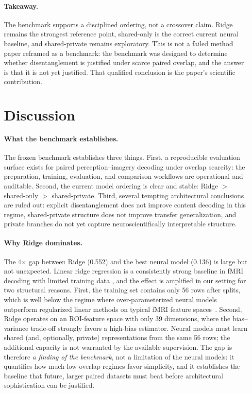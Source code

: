 \documentclass{article}
\begin{document}
\paragraph{Takeaway.}
The benchmark supports a disciplined ordering, not a crossover claim.  Ridge
remains the strongest reference point, shared-only is the correct current
neural baseline, and shared-private remains exploratory.  This is not a failed
method paper reframed as a benchmark: the benchmark was designed to determine
whether disentanglement is justified under scarce paired overlap, and the answer
is that it is not yet justified.  That qualified conclusion is the paper's
scientific contribution.

\section{Discussion}

\paragraph{What the benchmark establishes.}
The frozen benchmark establishes three things.  First, a reproducible evaluation
surface exists for paired perception--imagery decoding under overlap scarcity:
the preparation, training, evaluation, and comparison workflows are operational
and auditable.  Second, the current model ordering is clear and stable:
Ridge $>$ shared-only $>$ shared-private.  Third, several tempting architectural
conclusions are ruled out: explicit disentanglement does not improve content
decoding in this regime, shared-private structure does not improve transfer
generalization, and private branches do not yet capture neuroscientifically
interpretable structure.

\paragraph{Why Ridge dominates.}
The 4$\times$ gap between Ridge (0.552) and the best neural model (0.136) is
large but not unexpected.  Linear ridge regression is a consistently strong
baseline in fMRI decoding with limited training data
\citep{naselaris2011encoding}, and the effect is amplified in our setting for
two structural reasons.  First, the training set contains only 56 rows after
splits, which is well below the regime where over-parameterized neural models
outperform regularized linear methods on typical fMRI feature
spaces~\citep{horikawa2017generic}.  Second, Ridge operates on an ROI-feature
space with only 39 dimensions, where the bias--variance trade-off strongly
favors a high-bias estimator.  Neural models must learn shared (and,
optionally, private) representations from the same 56 rows; the additional
capacity is not warranted by the available supervision.  The gap is therefore
\emph{a finding of the benchmark}, not a limitation of the neural models: it
quantifies how much low-overlap regimes favor simplicity, and it establishes
the baseline that future, larger paired datasets must beat before architectural
sophistication can be justified.
\end{document}
